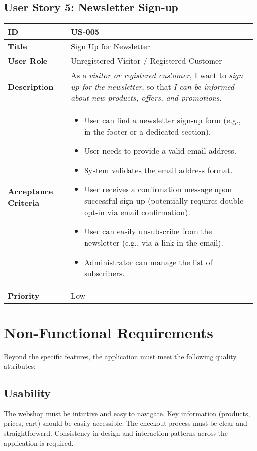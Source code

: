\documentclass[a4paper,11pt]{article}
\begin{document}
\subsection{User Story 5: Newsletter Sign-up}
\begin{tabularx}{\textwidth}{|l|X|}
\hline
\textbf{ID} & US-005 \\
\hline
\textbf{Title} & Sign Up for Newsletter \\
\hline
\textbf{User Role} & Unregistered Visitor / Registered Customer \\
\hline
\textbf{Description} & As a \textit{visitor or registered customer}, I want to \textit{sign up for the newsletter}, so that \textit{I can be informed about new products, offers, and promotions}. \\
\hline
\textbf{Acceptance Criteria} &
\begin{itemize}[noitemsep, topsep=0pt]
    \item User can find a newsletter sign-up form (e.g., in the footer or a dedicated section).
    \item User needs to provide a valid email address.
    \item System validates the email address format.
    \item User receives a confirmation message upon successful sign-up (potentially requires double opt-in via email confirmation).
    \item User can easily unsubscribe from the newsletter (e.g., via a link in the email).
    \item Administrator can manage the list of subscribers.
\end{itemize} \\
\hline
\textbf{Priority} & Low \\
\hline
\end{tabularx}

\section{Non-Functional Requirements}
Beyond the specific features, the application must meet the following quality attributes:

\subsection{Usability}
The webshop must be intuitive and easy to navigate. Key information (products, prices, cart) should be easily accessible. The checkout process must be clear and straightforward. Consistency in design and interaction patterns across the application is required.
\end{document}
